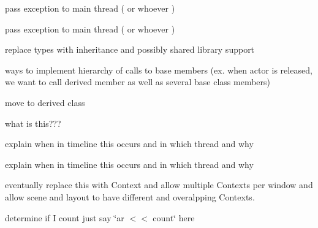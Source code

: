 
\begin{DoxyRefList}
\item[\label{todo__todo000015}%
\hypertarget{todo__todo000015}{}%
Member \hyperlink{classgal_1_1network_1_1communicating_abd5efaa6563dda2097f69ae3679f87a1}{gal\-:\-:network\-:\-:communicating\-:\-:thread\-\_\-read} ()]pass exception to main thread ( or whoever )  
\item[\label{todo__todo000014}%
\hypertarget{todo__todo000014}{}%
Member \hyperlink{classgal_1_1network_1_1communicating_ae183aa977aa6963e96a1abe2a94a749c}{gal\-:\-:network\-:\-:communicating\-:\-:thread\-\_\-write} (std\-::shared\-\_\-ptr$<$ message $>$)]pass exception to main thread ( or whoever )  
\item[\label{todo__todo000019}%
\hypertarget{todo__todo000019}{}%
Namespace \hyperlink{namespaceNeb}{Neb} ]replace types with inheritance and possibly shared library support 

ways to implement hierarchy of calls to base members (ex. when actor is released, we want to call derived member as well as several base class members) 
\item[\label{todo__todo000001}%
\hypertarget{todo__todo000001}{}%
Member \hyperlink{classNeb_1_1Actor_1_1Base_afc072654755bb4db2e1af77a55e7f8dd}{Neb\-:\-:Actor\-:\-:Base\-:\-:hit} ()]move to derived class  
\item[\label{todo__todo000002}%
\hypertarget{todo__todo000002}{}%
Member \hyperlink{classNeb_1_1Actor_1_1Base_ad51160f955b8bff638c938360ff3ce00}{Neb\-:\-:Actor\-:\-:Base\-:\-:mode\-\_\-update\-\_\-} ]what is this???  
\item[\label{todo__todo000008}%
\hypertarget{todo__todo000008}{}%
Member \hyperlink{classNeb_1_1Camera_1_1Projection_1_1Base_a7a0ef0507f546a0da56bb596de53c962}{Neb\-:\-:Camera\-:\-:Projection\-:\-:Base\-:\-:step} (double)]explain when in timeline this occurs and in which thread and why  
\item[\label{todo__todo000009}%
\hypertarget{todo__todo000009}{}%
Member \hyperlink{classNeb_1_1Camera_1_1View_1_1Base_aa3c5978efc6cd916f0f91bb8def375c5}{Neb\-:\-:Camera\-:\-:View\-:\-:Base\-:\-:step} (double)=0]explain when in timeline this occurs and in which thread and why  
\item[\label{todo__todo000010}%
\hypertarget{todo__todo000010}{}%
Class \hyperlink{classNeb_1_1Graphics_1_1Context_1_1Base}{Neb\-:\-:Graphics\-:\-:Context\-:\-:Base} ]eventually replace this with Context and allow multiple Contexts per window and allow scene and layout to have different and overalpping Contexts.  
\item[\label{todo__todo000013}%
\hypertarget{todo__todo000013}{}%
Member \hyperlink{structNeb_1_1Message_1_1Actor_1_1OUpdate_aa972a33a8c8220e7f6194e44c019d817}{Neb\-:\-:Message\-:\-:Actor\-:\-:O\-Update\-:\-:post} ()]determine if I count just say \char`\"{}ar $<$$<$ count\char`\"{} here 
\end{DoxyRefList}